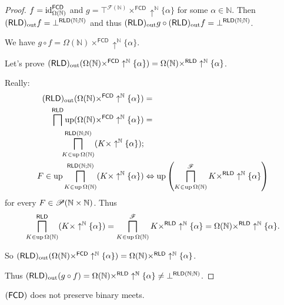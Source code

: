 \begin{proof}
$f=\operatorname{id}_{\Omega(\mathbb{N})}^{\mathsf{FCD}}$ and $g=\top^{\mathscr{F}(\mathbb{N})}\times^{\mathsf{FCD}}\uparrow^{\mathbb{N}}\{\alpha\}$
for some $\alpha\in\mathbb{N}$. Then $(\mathsf{RLD})_{\mathrm{out}} f=\bot^{\mathsf{RLD}(\mathbb{N};\mathbb{N})}$
and thus $(\mathsf{RLD})_{\mathrm{out}} g\circ(\mathsf{RLD})_{\mathrm{out}} f=\bot^{\mathsf{RLD}(\mathbb{N};\mathbb{N})}$.

We have $g\circ f=\Omega(\mathbb{N})\times^{\mathsf{FCD}}\uparrow^{\mathbb{N}}\{\alpha\}$.

Let's prove $(\mathsf{RLD})_{\mathrm{out}}(\Omega(\mathbb{N})\times^{\mathsf{FCD}}\uparrow^{\mathbb{N}}\{\alpha\})=\Omega(\mathbb{N})\times^{\mathsf{RLD}}\uparrow^{\mathbb{N}}\{\alpha\}$.

Really:
\begin{align*}
(\mathsf{RLD})_{\mathrm{out}}(\Omega(\mathbb{N})\times^{\mathsf{FCD}}\uparrow^{\mathbb{N}}\{\alpha\}) & =\\
\bigsqcap^{\mathsf{RLD}}\operatorname{up}(\Omega(\mathbb{N})\times^{\mathsf{FCD}}\uparrow^{\mathbb{N}}\{\alpha\}) & =\\
\bigsqcap_{K\in\operatorname{up}\Omega(\mathbb{N})}^{\mathsf{RLD}(\mathbb{N};\mathbb{N})}(K\times\uparrow^{\mathbb{N}}\{\alpha\});\\
F\in\operatorname{up}\bigsqcap_{K\in\operatorname{up}\Omega(\mathbb{N})}^{\mathsf{RLD}(\mathbb{N};\mathbb{N})}(K\times\uparrow^{\mathbb{N}}\{\alpha\}) & \Leftrightarrow\operatorname{up}\left(\bigsqcap_{K\in\operatorname{up}\Omega(\mathbb{N})}^{\mathscr{F}}K\times^{\mathsf{RLD}}\uparrow^{\mathbb{N}}\{\alpha\}\right)
\end{align*}
for every $F\in\mathscr{P}(\mathbb{N}\times\mathbb{N})$. Thus 
\[
\bigsqcap_{K\in\operatorname{up}\Omega(\mathbb{N})}^{\mathsf{RLD}}(K\times\uparrow^{\mathbb{N}}\{\alpha\})=\bigsqcap_{K\in\operatorname{up}\Omega(\mathbb{N})}^{\mathscr{F}}K\times^{\mathsf{RLD}}\uparrow^{\mathbb{N}}\{\alpha\}=\Omega(\mathbb{N})\times^{\mathsf{RLD}}\uparrow^{\mathbb{N}}\{\alpha\}.
\]


So $(\mathsf{RLD})_{\mathrm{out}}(\Omega(\mathbb{N})\times^{\mathsf{FCD}}\uparrow^{\mathbb{N}}\{\alpha\})=\Omega(\mathbb{N})\times^{\mathsf{RLD}}\uparrow^{\mathbb{N}}\{\alpha\}$.

Thus $(\mathsf{RLD})_{\mathrm{out}}(g\circ f)=\Omega(\mathbb{N})\times^{\mathsf{RLD}}\uparrow^{\mathbb{N}}\{\alpha\}\ne\bot^{\mathsf{RLD}(\mathbb{N};\mathbb{N})}$.\end{proof}
\begin{example}
$(\mathsf{FCD})$ does not preserve binary meets.\end{example}
